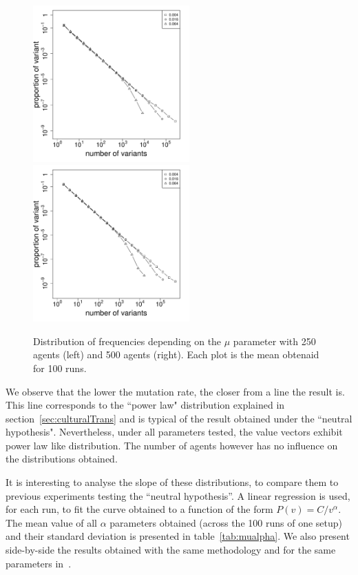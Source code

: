\documentclass{wscpaperproc}
\begin{document}
\begin{figure}[h]
	\begin{center}
		\includegraphics[width=6cm]{img/allmuRandMaxN250.pdf}
		\includegraphics[width=6cm]{img/allmuRandMaxN500.pdf}
	\end{center}
	\caption{Distribution of frequencies depending on the $\mu$ parameter with 250 agents (left) and 500 agents (right). Each plot is the mean obtenaid for 100 runs.\label{fig:allMutation}}
\end{figure}

We observe that the lower the mutation rate, the closer from a line the result is. This line corresponds to the ``power law" distribution explained in section~\ref{sec:culturalTrans} and is typical of the result obtained under the ``neutral hypothesis". Nevertheless, under all parameters tested, the value vectors exhibit power law like distribution. The number of agents however has no influence on the distributions obtained.

It is interesting to analyse the slope of these distributions, to compare them to previous experiments testing the ``neutral hypothesis''. A linear regression is used, for each run, to fit the curve obtained to a function of the form $P(v)=C/v^\alpha $. The mean value of all $\alpha$ parameters obtained (across the 100 runs of one setup) and their standard deviation is presented in table~\ref{tab:mualpha}. We also present side-by-side the results obtained with the same methodology and for the same parameters in~\cite{bentley_random_2004}.
\end{document}
